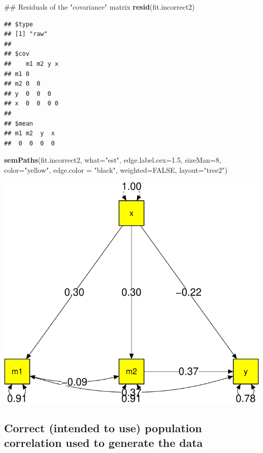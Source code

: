 \documentclass[]{article}
\newenvironment{Shaded}{\begin{snugshade}}{\end{snugshade}}
\newcommand{\KeywordTok}[1]{\textcolor[rgb]{0.13,0.29,0.53}{\textbf{#1}}}
\newcommand{\DataTypeTok}[1]{\textcolor[rgb]{0.13,0.29,0.53}{#1}}
\newcommand{\DecValTok}[1]{\textcolor[rgb]{0.00,0.00,0.81}{#1}}
\newcommand{\FloatTok}[1]{\textcolor[rgb]{0.00,0.00,0.81}{#1}}
\newcommand{\StringTok}[1]{\textcolor[rgb]{0.31,0.60,0.02}{#1}}
\newcommand{\OtherTok}[1]{\textcolor[rgb]{0.56,0.35,0.01}{#1}}
\newcommand{\NormalTok}[1]{#1}
\begin{document}
\begin{Shaded}
\begin{Highlighting}[]
\NormalTok{## Residuals of the "covariance" matrix}
\KeywordTok{resid}\NormalTok{(fit.incorrect2)}
\end{Highlighting}
\end{Shaded}

\begin{verbatim}
## $type
## [1] "raw"
## 
## $cov
##    m1 m2 y x
## m1 0        
## m2 0  0     
## y  0  0  0  
## x  0  0  0 0
## 
## $mean
## m1 m2  y  x 
##  0  0  0  0
\end{verbatim}

\begin{Shaded}
\begin{Highlighting}[]
\KeywordTok{semPaths}\NormalTok{(fit.incorrect2, }\DataTypeTok{what=}\StringTok{"est"}\NormalTok{, }\DataTypeTok{edge.label.cex=}\FloatTok{1.5}\NormalTok{, }
         \DataTypeTok{sizeMan=}\DecValTok{8}\NormalTok{, }\DataTypeTok{color=}\StringTok{"yellow"}\NormalTok{, }\DataTypeTok{edge.color =} \StringTok{"black"}\NormalTok{, }
         \DataTypeTok{weighted=}\OtherTok{FALSE}\NormalTok{, }\DataTypeTok{layout=}\StringTok{"tree2"}\NormalTok{)}
\end{Highlighting}
\end{Shaded}

\includegraphics{Supplemental_materials_3_files/figure-latex/unnamed-chunk-2-1.pdf}

\subsection{Correct (intended to use) population correlation used to
generate the
data}\label{correct-intended-to-use-population-correlation-used-to-generate-the-data}
\end{document}
